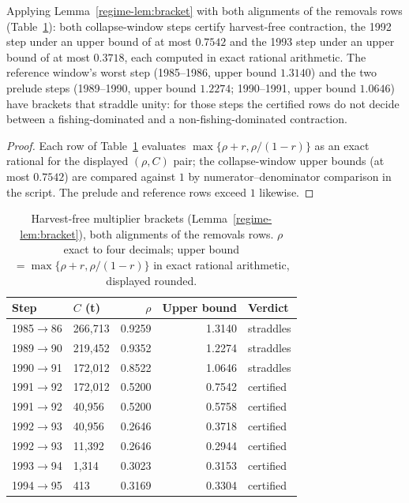 \begin{proposition}
\label{regime-prop:brackets}
Applying Lemma~\ref{regime-lem:bracket} with both alignments of the removals
rows (Table~\ref{regime-tab:brackets}): both collapse-window steps certify
harvest-free contraction, the 1992 step under an upper bound of at
most \(0.7542\) and the 1993 step under an upper bound of at most
\(0.3718\), each computed in exact rational arithmetic. The reference
window's worst step (1985--1986, upper bound \(1.3140\)) and the two
prelude steps (1989--1990, upper bound \(1.2274\); 1990--1991, upper
bound \(1.0646\)) have brackets that straddle unity: for those steps
the certified rows do not decide between a fishing-dominated and a
non-fishing-dominated contraction.
\end{proposition}

\begin{proof}
Each row of Table~\ref{regime-tab:brackets} evaluates
\(\max\{\rho + r, \rho/(1-r)\}\) as an exact rational for the displayed
\((\rho, C)\) pair; the collapse-window upper bounds (at most
\(0.7542\)) are compared against \(1\) by
numerator--denominator comparison in the script. The prelude and
reference rows exceed \(1\) likewise.
\end{proof}

\begin{table}[t]
\centering
\scriptsize
\setlength{\tabcolsep}{3.2pt}
\caption{Harvest-free multiplier brackets (Lemma~\ref{regime-lem:bracket}),
both alignments of the removals rows. \(\rho\) exact to four decimals;
upper bound \(=\max\{\rho+r, \rho/(1-r)\}\) in exact rational
arithmetic, displayed rounded.}
\label{regime-tab:brackets}
\begin{tabular}{@{}l l r r l@{}}
\toprule
Step & \(C\) (t) & \(\rho\) & Upper bound & Verdict \\
\midrule
1985$\to$86 & 266{,}713 & 0.9259 & 1.3140 & straddles \\
1989$\to$90 & 219{,}452 & 0.9352 & 1.2274 & straddles \\
1990$\to$91 & 172{,}012 & 0.8522 & 1.0646 & straddles \\
1991$\to$92 & 172{,}012 & 0.5200 & 0.7542 & certified \\
1991$\to$92 & 40{,}956 & 0.5200 & 0.5758 & certified \\
1992$\to$93 & 40{,}956 & 0.2646 & 0.3718 & certified \\
1992$\to$93 & 11{,}392 & 0.2646 & 0.2944 & certified \\
1993$\to$94 & 1{,}314 & 0.3023 & 0.3153 & certified \\
1994$\to$95 & 413 & 0.3169 & 0.3304 & certified \\
\bottomrule
\end{tabular}
\end{table}

